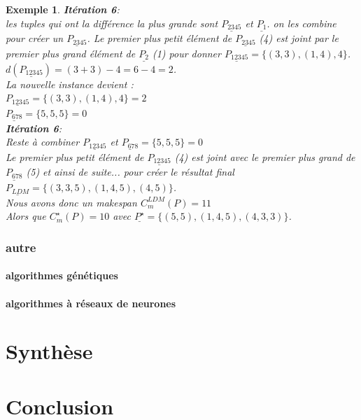 \documentclass[a4paper,12pt]{report}
\theoremstyle{plain}				%
\newtheorem{example}{Exemple}
\theoremstyle{definition}				%
\begin{document}
\begin{itemize}
\begin{example}
\textbf{Itération 6}:\\
les tuples qui ont la différence la plus grande sont 
$\underline{P_{2345}}$  et $\underline{P_{1}}$. 
on les combine pour créer un $\underline{P_{2345}}$. Le premier plus petit élément de $\underline{P_{2345}}$ (4) est joint par le premier plus grand élément de $\underline{P_{2}}$ (1) pour donner  $\underline{P_{12345}} = \{(3,3),(1,4),4\}$.  
$d(\underline{P_{12345}}) = (3+3)-4 = 6-4=2$.\\
La nouvelle instance devient :\\
$\underline{P_{12345}} = \{(3,3),(1,4),4\}=2$\\
$\underline{P_{678}} = \{5,5,5\}=0$\\

\textbf{Itération 6}:\\
Reste à combiner $\underline{P_{12345}}$ et $\underline{P_{678}} = \{5,5,5\}=0$\\
Le premier plus petit élément de $\underline{P_{12345}}$ (4) est joint avec le premier plus grand de  $\underline{P_{678}}$ (5) et ainsi de suite... pour créer le résultat final \\
$\underline{P_{LDM}}= \{(3,3,5),(1,4,5),(4,5)\}$.\\
 
Nous avons donc un makespan $C_m^{LDM}(P) = 11 $ \\
Alors que $C_m^{\star}(P) = 10$ avec $\underline{P^{\star}}= \{(5,5),(1,4,5),(4,3,3)\}$.
\end{example}



  



    

\end{itemize}
 


\subsubsection{autre}
\paragraph{algorithmes génétiques}
\paragraph{algorithmes à réseaux de neurones}






\section{Synthèse}

\section{Conclusion}









\medskip


\end{document}

